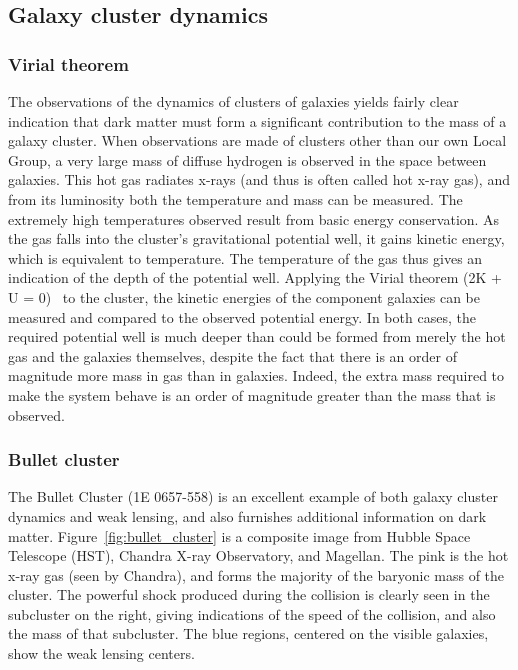 \subsection{Galaxy cluster dynamics}

\subsubsection{Virial theorem}

The observations of the dynamics of clusters of galaxies yields fairly clear indication that dark matter must form a significant contribution to the mass of a galaxy cluster. When observations are made of clusters other than our own Local Group, a very large mass of diffuse hydrogen is observed in the space between galaxies. This hot gas radiates x-rays (and thus is often called hot x-ray gas), and from its luminosity both the temperature and mass can be measured. The extremely high temperatures observed result from basic energy conservation. As the gas falls into the cluster's gravitational potential well, it gains kinetic energy, which is equivalent to temperature. The temperature of the gas thus gives an indication of the depth of the potential well. Applying the Virial theorem (2K + U = 0)~\cite{Claussius:1870} to the cluster, the kinetic energies of the component galaxies can be measured and compared to the observed potential energy. In both cases, the required potential well is much deeper than could be formed from merely the hot gas and the galaxies themselves, despite the fact that there is an order of magnitude more mass in gas than in galaxies. Indeed, the extra mass required to make the system behave is an order of magnitude greater than the mass that is observed.

\subsubsection{Bullet cluster}

The Bullet Cluster (1E 0657-558) is an excellent example of both galaxy cluster dynamics and weak lensing, and also furnishes additional information on dark matter. Figure~\ref{fig:bullet_cluster} is a composite image from Hubble Space Telescope (HST), Chandra X-ray Observatory, and Magellan. The pink is the hot x-ray gas (seen by Chandra), and forms the majority of the baryonic mass of the cluster. The powerful shock produced during the collision is clearly seen in the subcluster on the right, giving indications of the speed of the collision, and also the mass of that subcluster. The blue regions, centered on the visible galaxies, show the weak lensing centers.

